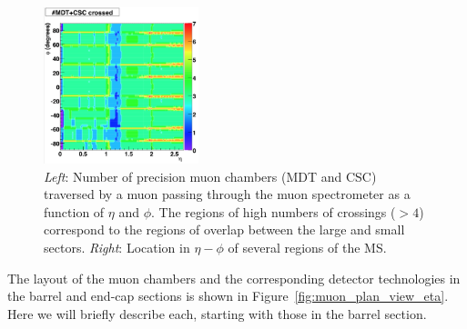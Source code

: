 \begin{figure}[!htb]
    \begin{center}
        \includegraphics[width=0.4\textwidth]{figures/chapter2/muon_spec/atlas_ms_nchamber_crossed}
        \caption{
            \textit{Left}: Number of precision muon chambers (MDT and CSC) traversed by a muon passing through the muon
                spectrometer as a function of $\eta$ and $\phi$.
                The regions of high numbers of crossings ($>4$) correspond to the regions of overlap
                between the large and small sectors.
            \textit{Right}: Location in $\eta-\phi$ of several regions of the MS.
        }
        \label{fig:muon_nchambers_crossed}
    \end{center}
\end{figure}
\FloatBarrier

The layout of the muon chambers and the corresponding detector technologies
in the barrel and end-cap sections is shown in Figure~\ref{fig:muon_plan_view_eta}.
Here we will briefly describe each, starting with those in the barrel section.

